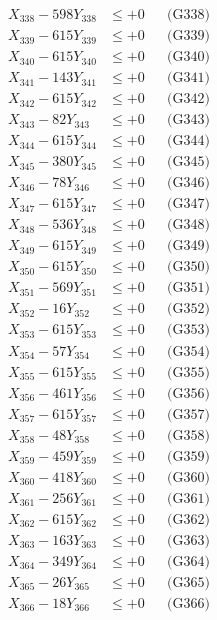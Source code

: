 \documentclass[a4paper,10pt]{article}
\begin{document}
{\begin{align}
X_{338} - 598Y_{338} &\leq +0 && \text{(G338)} \\
X_{339} - 615Y_{339} &\leq +0 && \text{(G339)} \\
X_{340} - 615Y_{340} &\leq +0 && \text{(G340)} \\
\allowbreak
X_{341} - 143Y_{341} &\leq +0 && \text{(G341)} \\
X_{342} - 615Y_{342} &\leq +0 && \text{(G342)} \\
X_{343} - 82Y_{343} &\leq +0 && \text{(G343)} \\
X_{344} - 615Y_{344} &\leq +0 && \text{(G344)} \\
X_{345} - 380Y_{345} &\leq +0 && \text{(G345)} \\
X_{346} - 78Y_{346} &\leq +0 && \text{(G346)} \\
X_{347} - 615Y_{347} &\leq +0 && \text{(G347)} \\
X_{348} - 536Y_{348} &\leq +0 && \text{(G348)} \\
X_{349} - 615Y_{349} &\leq +0 && \text{(G349)} \\
X_{350} - 615Y_{350} &\leq +0 && \text{(G350)} \\
\allowbreak
X_{351} - 569Y_{351} &\leq +0 && \text{(G351)} \\
X_{352} - 16Y_{352} &\leq +0 && \text{(G352)} \\
X_{353} - 615Y_{353} &\leq +0 && \text{(G353)} \\
X_{354} - 57Y_{354} &\leq +0 && \text{(G354)} \\
X_{355} - 615Y_{355} &\leq +0 && \text{(G355)} \\
X_{356} - 461Y_{356} &\leq +0 && \text{(G356)} \\
X_{357} - 615Y_{357} &\leq +0 && \text{(G357)} \\
X_{358} - 48Y_{358} &\leq +0 && \text{(G358)} \\
X_{359} - 459Y_{359} &\leq +0 && \text{(G359)} \\
X_{360} - 418Y_{360} &\leq +0 && \text{(G360)} \\
\allowbreak
X_{361} - 256Y_{361} &\leq +0 && \text{(G361)} \\
X_{362} - 615Y_{362} &\leq +0 && \text{(G362)} \\
X_{363} - 163Y_{363} &\leq +0 && \text{(G363)} \\
X_{364} - 349Y_{364} &\leq +0 && \text{(G364)} \\
X_{365} - 26Y_{365} &\leq +0 && \text{(G365)} \\
X_{366} - 18Y_{366} &\leq +0 && \text{(G366)} \\

\end{align}}
\end{document}

